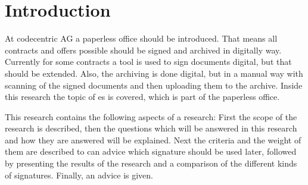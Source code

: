 \section{Introduction}

At codecentric AG a paperless office should be introduced. That means all contracts and offers possible should be signed and archived in digitally way. Currently for some contracts a tool is used to sign documents digital, but that should be extended. Also, the archiving is done digital, but in a manual way with scanning of the signed documents and then uploading them to the archive. Inside this research the topic of \gls{es} is covered, which is part of the paperless office.

This research contains the following aspects of a research: First the scope of the research is described, then the questions which will be answered in this research and how they are answered will be explained. Next the criteria and the weight of them are described to can advice which signature should be used later, followed by presenting the results of the research and a comparison of the different kinds of signatures. Finally, an advice is given.  
